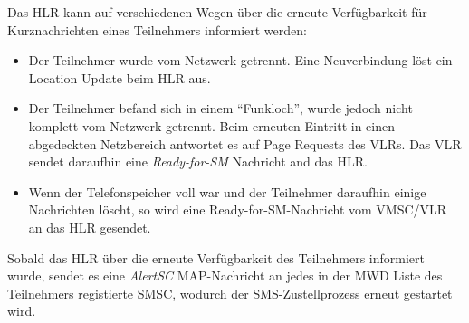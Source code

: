 \documentclass[german,12pt,a4paper]{article}
\begin{document}
Das HLR kann auf verschiedenen Wegen über die erneute Verfügbarkeit für Kurznachrichten eines Teilnehmers 
informiert werden:
\begin{itemize}
    \item Der Teilnehmer wurde vom Netzwerk getrennt. Eine Neuverbindung löst ein Location Update beim 
    HLR aus.
    \item Der Teilnehmer befand sich in einem ``Funkloch'', wurde jedoch nicht komplett vom Netzwerk
    getrennt. Beim erneuten Eintritt in einen abgedeckten Netzbereich antwortet es auf Page Requests
    des VLRs. Das VLR sendet daraufhin eine \textit{Ready-for-SM} Nachricht and das HLR.
    \item Wenn der Telefonspeicher voll war und der Teilnehmer daraufhin einige Nachrichten löscht, so
    wird eine Ready-for-SM-Nachricht vom VMSC/VLR an das HLR gesendet.
\end{itemize}

Sobald das HLR über die erneute Verfügbarkeit des Teilnehmers informiert wurde, sendet es eine \textit{AlertSC} 
MAP-Nachricht an jedes in der MWD Liste des Teilnehmers registierte SMSC, wodurch der SMS-Zustellprozess
erneut gestartet wird\cite{3gpp:map}.

\end{document}
